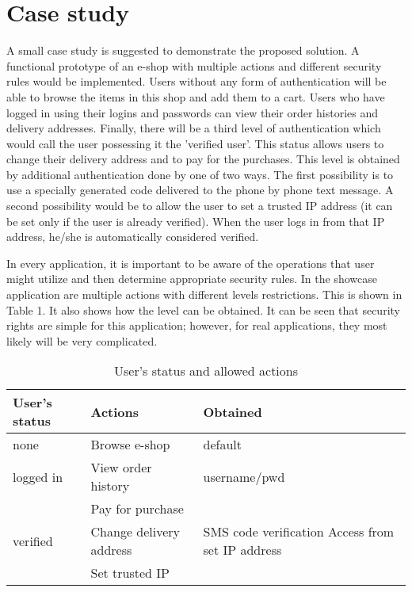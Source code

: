 \documentclass{sig-alternate}
\begin{document}
\section{Case study}
A small case study is suggested to demonstrate the proposed solution.  A functional prototype of an e-shop with multiple actions and different security rules would be implemented. Users without any form of authentication will be able to browse the items in this shop and add them to a cart. Users who have logged in using their logins and passwords can view their order histories and delivery addresses. Finally, there will be a third level of authentication which would call the user possessing it the 'verified user'. This status allows users to change their delivery address and to pay for the purchases. This level is obtained by additional authentication done by one of two ways. The first possibility is to use a specially generated code delivered to the phone by phone text message. A second possibility would be to allow the user to set a trusted IP address (it can be set only if the user is already verified). When the user logs in from that IP address, he/she is automatically considered verified.

In every application, it is important to be aware of the operations that user might utilize and then determine appropriate security rules. In the showcase application are multiple actions with different levels restrictions. This is shown in Table 1. It also shows how the level can be obtained. It can be seen that security rights are simple for this application; however, for real applications, they most likely will be very complicated.

\begin{table}
\begin{tabular}{|m{2cm}|m{2.5cm}|m{3cm}|} \hline
User's status&Actions&Obtained\\ \hline
none & Browse e-shop & default\\ \hline
logged in & View order \newline history & username/pwd\\ \hline
 & Pay for purchase & \multirow{3}{*}{\parbox[t][][c]{3cm}{SMS code verification \newline Access from set IP address}} \\[5pt]
verified & Change delivery address &  \\[5pt] 
 & Set trusted IP & \\[5pt]
\hline\end{tabular}
\vspace{-0.8em}
\caption{User's status and allowed actions}
\vspace{-1em}
\end{table}
\end{document}

